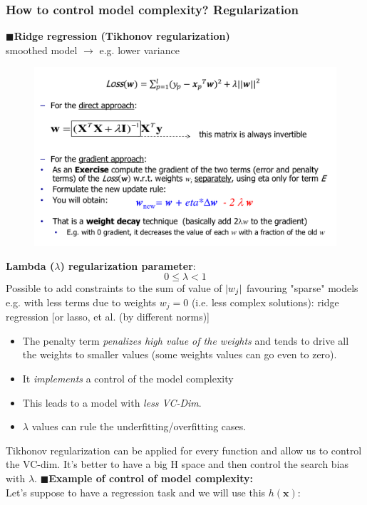 \documentclass[../main.tex]{subfiles}
\begin{document}
\subsubsection{How to control model complexity? Regularization}
\noindent$\blacksquare$\textbf{Ridge regression (Tikhonov regularization)}\\
smoothed model $\rightarrow$ e.g. lower variance
\begin{figure}[H]
    \centering
    \includegraphics[scale = 0.3]{lectures/2_linear_model/tikhonov.png}
    \label{fig:2_tikhonov}
\end{figure}
\textbf{Lambda ($\lambda$) regularization parameter}: 
$$ 0\leq \lambda < 1$$
Possible to add constraints to the sum of value of $\lvert w_j\rvert$ favouring "sparse" models e.g. with less terms due to weights $w_j=0$ (i.e. less complex solutions): ridge regression [or lasso, et al. (by different norms)]

\begin{itemize}
    \item The penalty term \emph{penalizes high value of the weights} and tends to drive all the weights to smaller values (some weights values can go even to zero).
    \item It \emph{implements} a control of the model complexity
    \item This leads to a model with \emph{less VC-Dim}.
    \item $\lambda$ values can rule the underfitting/overfitting cases.
\end{itemize}
Tikhonov regularization can be applied for every function and allow us to control the VC-dim. It's better to have a big H space and then control the search bias with $\lambda$.
\newpage
\noindent$\blacksquare$\textbf{Example of control of model complexity:}\\
Let's suppose to have a regression task and we will use this $h(\mathbf{x})$:
\end{document}
